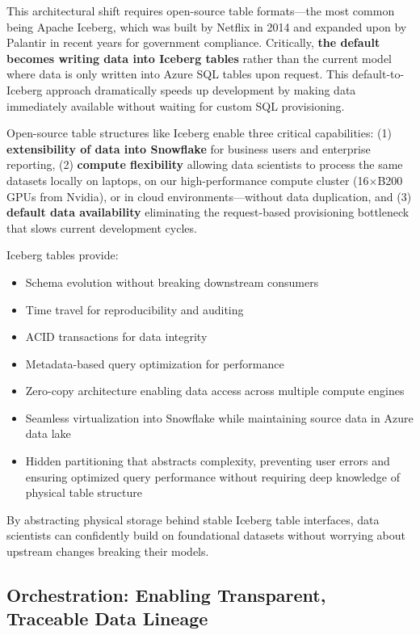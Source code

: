 \documentclass[12pt, a4paper]{article}
\begin{document}
This architectural shift requires open-source table formats—the most common being Apache Iceberg, which was built by Netflix in 2014 and expanded upon by Palantir in recent years for government compliance. Critically, \textbf{the default becomes writing data into Iceberg tables} rather than the current model where data is only written into Azure SQL tables upon request. This default-to-Iceberg approach dramatically speeds up development by making data immediately available without waiting for custom SQL provisioning.

Open-source table structures like Iceberg enable three critical capabilities: (1) \textbf{extensibility of data into Snowflake} for business users and enterprise reporting, (2) \textbf{compute flexibility} allowing data scientists to process the same datasets locally on laptops, on our high-performance compute cluster (16$\times$B200 GPUs from Nvidia), or in cloud environments—without data duplication, and (3) \textbf{default data availability} eliminating the request-based provisioning bottleneck that slows current development cycles.

Iceberg tables provide:

\begin{itemize}[leftmargin=*, nosep]
    \item Schema evolution without breaking downstream consumers
    \item Time travel for reproducibility and auditing
    \item ACID transactions for data integrity
    \item Metadata-based query optimization for performance
    \item Zero-copy architecture enabling data access across multiple compute engines
    \item Seamless virtualization into Snowflake while maintaining source data in Azure data lake
    \item Hidden partitioning that abstracts complexity, preventing user errors and ensuring optimized query performance without requiring deep knowledge of physical table structure
\end{itemize}

By abstracting physical storage behind stable Iceberg table interfaces, data scientists can confidently build on foundational datasets without worrying about upstream changes breaking their models.

\subsection{Orchestration: Enabling Transparent, Traceable Data Lineage}
\end{document}
